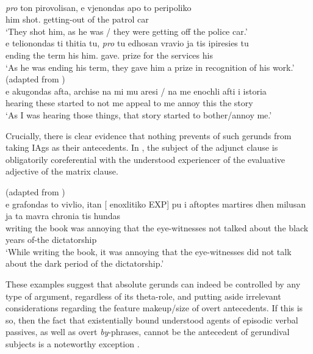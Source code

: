 \documentclass[output=paper]{langsci/langscibook}
\begin{document}
\ea%
    \label{ex:22.12} \\
    \gll    \emph{pro} ton   pirovolisan, e vjenondas   apo to      peripoliko\\
            {}       him  shot.\Tpl{} {}  getting-out  of    the    patrol car\\
    \glt    \enquote*{They shot him, as he was / they were getting off the police car.}
\ex%
    \label{ex:22.13} \\
    \gll    e telionondas   ti   thitia   tu, \emph{pro} tu     edhosan  vravio ja   tis   ipiresies tu\\
            {} ending    the   term  his {} him.\Dat{}  gave.\Tpl{} prize    for  the services  his\\
    \glt    \enquote*{As he was ending his term, they gave him a prize in recognition of his work.}
\ex%
    \label{ex:22.14}  (adapted from \citealt{Anagnostopoulou1999})\\
    \gll    e  akugondas   afta, archise  na   mi  mu  aresi / na   me  enochli        afti     i       istoria\\
    {}   hearing    these started    to  not  me  appeal {} to   me  annoy this     the  story\\
    \glt    \enquote*{As I was hearing those things, that story started to bother/annoy me.}
\z

Crucially, there is clear evidence that nothing prevents  of such
gerunds from taking \glspl{IAg} as their antecedents. In , the subject
of the adjunct clause is obligatorily coreferential with the understood
experiencer of the evaluative adjective of the matrix clause.

\ea%
    \label{ex:22.15}  (adapted from \citealt{Kotzoglou2016})\\
    \gll    e grafondas to   vivlio, itan [ enoxlitiko  EXP] pu      i   {aftoptes martires} dhen milusan  ja   ta  mavra   chronia tis     hundas\\
            {} writing    the   book   was {} annoying {} that the eye-witnesses not     talked     about  the   black   years of-the   dictatorship\\
    \glt    \enquote*{While writing the book, it was annoying that the eye-witnesses did not talk about the dark period of the dictatorship.}
\z

These examples suggest that absolute gerunds can indeed be controlled by any
type of argument, regardless of its theta-role, and putting aside irrelevant
considerations regarding the feature makeup/size of overt antecedents. If this
is so, then the fact that existentially bound understood agents of episodic
verbal passives, as well as
overt \emph{by}-phrases, cannot be the antecedent of gerundival subjects is a
noteworthy exception .
\end{document}
